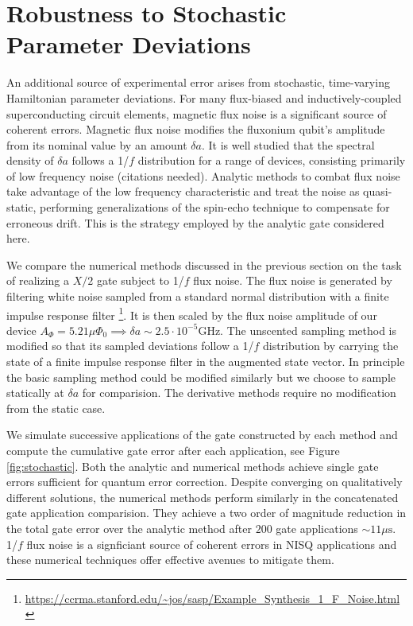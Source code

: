 \section{Robustness to Stochastic Parameter Deviations}
An additional source of experimental error arises from stochastic, time-varying
Hamiltonian parameter deviations. For many flux-biased and inductively-coupled
superconducting circuit elements, magnetic flux noise is a significant
source of coherent errors. Magnetic flux noise
modifies the fluxonium qubit's amplitude from its nominal value by an amount $\delta a$.
It is well studied that the spectral density of $\delta a$ follows a
1/$f$ distribution for a range of devices, consisting primarily of low frequency
noise (citations needed). Analytic methods to combat flux noise
take advantage of the low frequency characteristic and
treat the noise as quasi-static, performing generalizations of the spin-echo technique
to compensate for erroneous drift. This is the strategy employed by the analytic gate
considered here.

We compare the numerical methods discussed in the previous section
on the task of realizing a $X/2$ gate subject to 1/$f$ flux noise.
The flux noise is generated by
filtering white noise sampled from a standard normal distribution with a finite
impulse response filter \cite{saspweb2011}
\footnote{\url{https://ccrma.stanford.edu/~jos/sasp/Example_Synthesis_1_F_Noise.html}}.
It is then scaled by the 
flux noise amplitude of our device $A_{\Phi} = 5.21 \mu \Phi_{0} \implies
\delta a \sim 2.5 \cdot 10^{-5} \textrm{GHz}$.
The unscented sampling method is modified so that its sampled deviations
follow a 1/$f$ distribution by carrying the state of a finite impulse response filter
in the augmented state vector. In principle the basic sampling method could be modified
similarly but we choose to sample statically at $\delta a$ for comparision. The derivative
methods require no modification from the static case.

We simulate successive applications of the gate constructed by each method and compute the cumulative gate error
after each application, see Figure \ref{fig:stochastic}. Both the analytic and numerical methods achieve single gate errors
sufficient for quantum error correction. Despite converging on qualitatively different solutions, the
numerical methods perform similarly in the concatenated gate application comparision. They achieve a two
order of magnitude reduction in the total gate error over the analytic method after $200$
gate applications $\sim 11 \mu\textrm{s}$.
1/$f$ flux noise is a signficiant source of coherent errors in NISQ applications and
these numerical techniques offer effective avenues to mitigate them.
